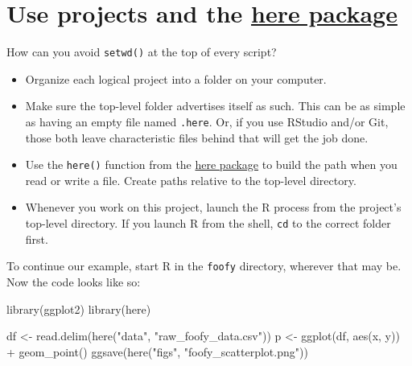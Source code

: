 \documentclass[
  letterpaper,
]{book}
\newenvironment{Shaded}{\begin{snugshade}}{\end{snugshade}}
\newcommand{\FunctionTok}[1]{\textcolor[rgb]{0.28,0.35,0.67}{#1}}
\newcommand{\NormalTok}[1]{\textcolor[rgb]{0.00,0.23,0.31}{#1}}
\newcommand{\OtherTok}[1]{\textcolor[rgb]{0.00,0.23,0.31}{#1}}
\newcommand{\SpecialCharTok}[1]{\textcolor[rgb]{0.37,0.37,0.37}{#1}}
\newcommand{\StringTok}[1]{\textcolor[rgb]{0.13,0.47,0.30}{#1}}
\providecommand{\tightlist}{%
  \setlength{\itemsep}{0pt}\setlength{\parskip}{0pt}}\usepackage{longtable,booktabs,array}
\begin{document}
\hypertarget{use-projects-and-the-here-package}{%
\section{\texorpdfstring{Use projects and the
\href{https://CRAN.R-project.org/package=here}{here
package}}{Use projects and the here package}}\label{use-projects-and-the-here-package}}

How can you avoid \texttt{setwd()} at the top of every script?

\begin{itemize}
\tightlist
\item
  Organize each logical project into a folder on your computer.
\item
  Make sure the top-level folder advertises itself as such. This can be
  as simple as having an empty file named \texttt{.here}. Or, if you use
  RStudio and/or Git, those both leave characteristic files behind that
  will get the job done.
\item
  Use the \texttt{here()} function from the
  \href{https://CRAN.R-project.org/package=here}{here package} to build
  the path when you read or write a file. Create paths relative to the
  top-level directory.
\item
  Whenever you work on this project, launch the R process from the
  project's top-level directory. If you launch R from the shell,
  \texttt{cd} to the correct folder first.
\end{itemize}

To continue our example, start R in the \texttt{foofy} directory,
wherever that may be. Now the code looks like so:

\begin{Shaded}
\begin{Highlighting}[]
\FunctionTok{library}\NormalTok{(ggplot2)}
\FunctionTok{library}\NormalTok{(here)}

\NormalTok{df }\OtherTok{\textless{}{-}} \FunctionTok{read.delim}\NormalTok{(}\FunctionTok{here}\NormalTok{(}\StringTok{"data"}\NormalTok{, }\StringTok{"raw\_foofy\_data.csv"}\NormalTok{))}
\NormalTok{p }\OtherTok{\textless{}{-}} \FunctionTok{ggplot}\NormalTok{(df, }\FunctionTok{aes}\NormalTok{(x, y)) }\SpecialCharTok{+} \FunctionTok{geom\_point}\NormalTok{()}
\FunctionTok{ggsave}\NormalTok{(}\FunctionTok{here}\NormalTok{(}\StringTok{"figs"}\NormalTok{, }\StringTok{"foofy\_scatterplot.png"}\NormalTok{))}
\end{Highlighting}
\end{Shaded}
\end{document}
